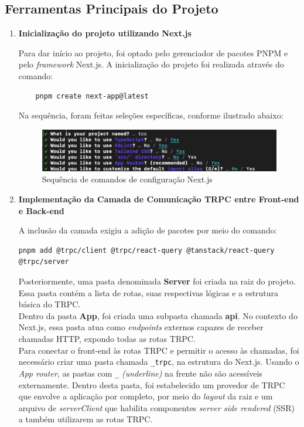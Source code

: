\subsection{Ferramentas Principais do Projeto}

\begin{enumerate}

    \item\textbf{Inicialização do projeto utilizando Next.js}
    
    Para dar início ao projeto, foi optado pelo gerenciador de pacotes PNPM e pelo \textit{framework} Next.js. A inicialização do projeto foi realizada através do comando:

\begin{verbatim}
    pnpm create next-app@latest
\end{verbatim}
    
    Na sequência, foram feitas seleções específicas, conforme ilustrado abaixo:
    
\begin{figure}[!ht]
    \centering
    \includegraphics[scale=0.38]{latex/figuras/nextjs.pdf}
    \caption[Ferramentas Principais do Projeto]{Sequência de comandos de configuração Next.js}
    \label{fig:enter-label}
\end{figure}

    \item\textbf{Implementação da Camada de Comunicação TRPC entre Front-end e Back-end}
    
    A inclusão da camada exigiu a adição de pacotes por meio do comando:
    
\begin{small}
\begin{verbatim}
pnpm add @trpc/client @trpc/react-query @tanstack/react-query @trpc/server
\end{verbatim}
\end{small}

    Posteriormente, uma pasta denominada \textbf{Server} foi criada na raiz do projeto. Essa pasta contém a lista de rotas, suas respectivas lógicas e a estrutura básica do TRPC.\\Dentro da pasta \textbf{App}, foi criada uma subpasta chamada \textbf{api}. No contexto do Next.js, essa pasta atua como \textit{endpoints} externos capazes de receber chamadas HTTP, expondo todas as rotas TRPC.\\ 
    Para conectar o front-end às rotas TRPC e permitir o acesso às chamadas, foi necessário criar uma pasta chamada \verb|_trpc|, na estrutura do Next.js. Usando o \textit{App router}, as pastas com \verb|_| \textit{(underline)} na frente não são acessíveis externamente. Dentro desta pasta, foi estabelecido um provedor de TRPC que envolve a aplicação por completo, por meio do \textit{layout} da raiz e um arquivo de \textit{serverClient} que habilita componentes \textit{server side rendered} (SSR) a também utilizarem as rotas TRPC.
    

\end{enumerate}
